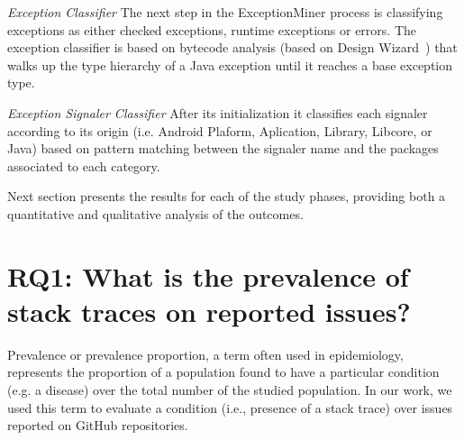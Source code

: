 \documentclass[conference]{IEEEtran}
\begin{document}


\noindent\emph{Exception Classifier} The next step in the ExceptionMiner process
is classifying exceptions as either checked exceptions, runtime exceptions or 
errors. The exception classifier is based on bytecode analysis (based on Design
Wizard~\cite{Brunet09}) that walks up the type hierarchy of a Java exception
until it reaches a base exception type.

\noindent\emph{Exception Signaler Classifier} After its initialization it
classifies each signaler according to its origin (i.e. Android Plaform,
Aplication, Library, Libcore, or Java) based on pattern matching between the
signaler name and the packages associated to each category.

Next section presents the results for each of the study phases, providing both a
quantitative and qualitative analysis of the outcomes.


\section{RQ1: What is the prevalence of stack traces on reported issues?}

Prevalence or prevalence proportion, a term often used in epidemiology,
represents the proportion of a population found to have a particular condition
(e.g. a disease) over the total number of the studied population. In our work, we used
this term to evaluate a condition (i.e., presence of a stack trace) over issues
reported on GitHub repositories.
\end{document}
